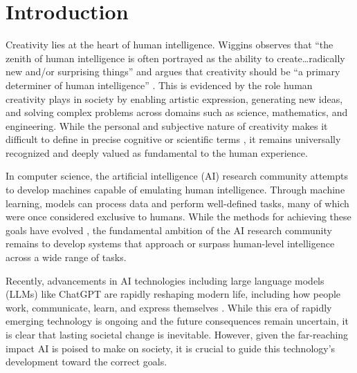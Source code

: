 \documentclass[phd,electronic,oneside,twosidetoc,letterpaper,chaptercenter,parttop,lof]{byumsphd}
\title{\Title}
\author{\Author}
\begin{document}
\maketitle
{}

\chapter{Introduction} 
\label{chap:intro}

Creativity lies at the heart of human intelligence.
Wiggins observes that “the zenith of human intelligence is often portrayed as the ability to create…radically new and/or surprising things” and argues that creativity should be “a primary determiner of human intelligence” \cite{wiggins2006}.
This is evidenced by the role human creativity plays in society by enabling artistic expression, generating new ideas, and solving complex problems across domains such as science, mathematics, and engineering.
While the personal and subjective nature of creativity makes it difficult to define in precise cognitive or scientific terms \cite{boden1990creativity,Cskszentmihlyi1996CreativityFA,wiggins2006creativity,Simonton2018DefiningCD}, it remains universally recognized and deeply valued as fundamental to the human experience.

In computer science, the artificial intelligence (AI) research community attempts to develop machines capable of emulating human intelligence.
Through machine learning, models can process data and perform well-defined tasks, many of which were once considered exclusive to humans.
While the methods for achieving these goals have evolved \cite{Schmidhuber2022AnnotatedHO}, the fundamental ambition of the AI research community remains to develop systems that approach or surpass human-level intelligence across a wide range of tasks.

Recently, advancements in AI technologies including large language models (LLMs) like ChatGPT \cite{chatGPT} are rapidly reshaping modern life, including how people work, communicate, learn, and express themselves \cite{Gowda2023ArtificialII}. 
While this era of rapidly emerging technology is ongoing and the future consequences remain uncertain, it is clear that lasting societal change is inevitable.
However, given the far-reaching impact AI is poised to make on society, it is crucial to guide this technology's development toward the correct goals. 
\end{document}
